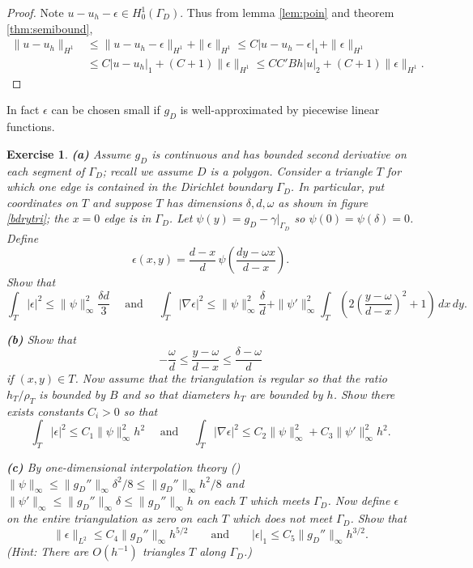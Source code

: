 \documentclass[12pt]{amsart}
\newtheorem*{exercise}{Exercise}
\theoremstyle{definition}
\newcommand{\eps}{\epsilon}
\newcommand{\grad}{\nabla}
\begin{document}
\begin{proof}   Note $u-u_h-\eps\in H_0^1(\Gamma_D)$.  Thus from lemma \ref{lem:poin} and theorem \ref{thm:semibound},
\begin{align*}
\|u-u_h\|_{H^1} &\le \|u-u_h-\eps\|_{H^1} + \|\eps\|_{H^1} \le C |u-u_h-\eps|_1 + \|\eps\|_{H^1} \\
    &\le C|u-u_h|_1 + (C+1)\|\eps\|_{H^1} \le C C' B h |u|_2 + (C+1)\|\eps\|_{H^1}.
\end{align*}\end{proof}

In fact $\eps$ can be chosen small if $g_D$ is well-approximated by piecewise linear functions.  

\begin{exercise}  \emph{\textbf{(a)}}  Assume $g_D$ is continuous and has bounded second derivative on each segment of $\Gamma_D$; recall we assume $D$ is a polygon.  Consider a triangle $T$ for which one edge is contained in the Dirichlet boundary $\Gamma_D$.  In particular, put coordinates on $T$ and suppose $T$ has dimensions $\delta,d,\omega$ as shown in figure \ref{bdrytri}; the $x=0$ edge is in $\Gamma_D$.  Let $\psi(y)=g_D-\gamma\big|_{\Gamma_D}$ so $\psi(0)=\psi(\delta)=0$.  Define
    $$\eps(x,y) = \frac{d-x}{d} \,\psi\left(\frac{dy-\omega x}{d-x}\right).$$
Show that
    $$\int_T |\eps|^2 \le \|\psi\|_\infty^2 \frac{\delta d}{3} \quad \text{ and }  \quad  \int_T |\grad \eps|^2 \le \|\psi\|_\infty^2 \frac{\delta}{d} + \|\psi'\|_\infty^2 \int_T \left(2 \left(\frac{y-\omega}{d-x}\right)^2 + 1\right)\,dx\,dy.$$

\noindent \emph{\textbf{(b)}}  Show that
    $$-\frac{\omega}{d} \le \frac{y-\omega}{d-x} \le \frac{\delta -\omega}{d}$$
if $(x,y)\in T$.  Now assume that the triangulation is regular so that the ratio $h_T/\rho_T$ is bounded by $B$ and so that diameters $h_T$ are bounded by $h$.  Show there exists constants $C_i>0$ so that 
    $$\int_T |\eps|^2 \le C_1 \|\psi\|_\infty^2 h^2 \quad \text{ and }  \quad  \int_T |\grad \eps|^2 \le C_2 \|\psi\|_\infty^2 + C_3 \|\psi'\|_\infty^2 h^2.$$

\noindent \emph{\textbf{(c)}}  By one-dimensional interpolation theory (\cite[page 25]{Johnson})  $\|\psi\|_\infty \le \|g_D''\|_\infty \delta^2/8 \le \|g_D''\|_\infty h^2/8$ and $\|\psi'\|_\infty \le \|g_D''\|_\infty \delta \le \|g_D''\|_\infty h$ on each $T$ which meets $\Gamma_D$.  Now define $\eps$ on the entire triangulation as zero on each $T$ which does not meet $\Gamma_D$.  Show that
    $$\|\eps\|_{L^2} \le C_4 \|g_D''\|_\infty h^{5/2} \qquad \text{and} \qquad |\eps|_1 \le C_5 \|g_D''\|_\infty h^{3/2}.$$
(\emph{Hint}:  There are $O(h^{-1})$ triangles $T$ along $\Gamma_D$.)
\end{exercise}
\end{document}
